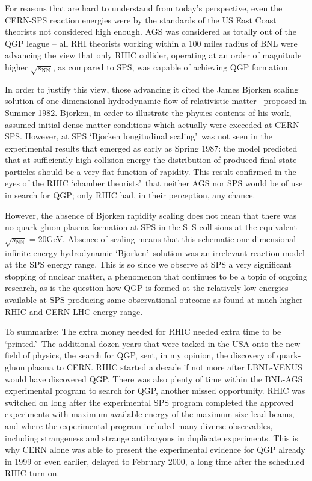For reasons that are hard to understand from today\rq s perspective, even the CERN-SPS reaction energies were by the standards of the US East Coast theorists not considered high enough. AGS was considered as totally out of the QGP league -- all RHI theorists working within a 100 miles radius of BNL\label{100miles} were advancing the view that only RHIC collider, operating at an order of magnitude higher $\sqrt{s_\mathrm{NN}}$, as compared to SPS, was capable of achieving QGP formation. 

In order to justify this view, those advancing it cited the James Bjorken scaling solution of one-dimensional hydrodynamic flow of relativistic matter~\cite{Bjorken:1982qr} proposed in Summer 1982. Bjorken, in order to illustrate the physics contents of his work, assumed initial dense matter conditions which actually were exceeded at CERN-SPS. However, at SPS \lq Bjorken longitudinal scaling\rq\ was not seen in the experimental results that emerged as early as Spring 1987: the model predicted that at sufficiently high collision energy the distribution of produced final state particles should be a very flat function of rapidity. This result confirmed in the eyes of the RHIC \lq chamber theorists\rq\ that neither AGS nor SPS would be of use in search for QGP; only RHIC had, in their perception, any chance. 

However, the absence of Bjorken rapidity scaling does not mean that there was no quark-gluon plasma formation at SPS in the S--S collisions at the equivalent $\sqrt{s_\mathrm{NN}}=20$\;GeV. Absence of scaling means that this schematic one-dimensional infinite energy hydrodynamic \lq Bjorken\rq\ solution was an irrelevant reaction model at the SPS energy range. This is so since we observe at SPS a very significant stopping of nuclear matter, a phenomenon that continues to be a topic of ongoing research, as is the question how QGP is formed at the relatively low energies available at SPS producing same observational outcome as found at much higher RHIC and CERN-LHC energy range. 

To summarize: The extra money needed for RHIC needed extra time to be \lq printed.\rq\ The additional dozen years that were tacked in the USA onto the new field of physics, the search for QGP, sent, in my opinion, the discovery of quark-gluon plasma to CERN. RHIC started a decade if not more after LBNL-VENUS would have discovered QGP. There was also plenty of time within the BNL-AGS experimental program to search for QGP, another missed opportunity. RHIC was switched on long after the experimental SPS program completed the approved experiments with maximum available energy of the maximum size lead beams, and where the experimental program included many diverse observables, including strangeness and strange antibaryons in duplicate experiments. This is why CERN alone was able to present the experimental evidence for QGP already in 1999 or even earlier, delayed to February 2000, a long time after the scheduled RHIC turn-on. 


